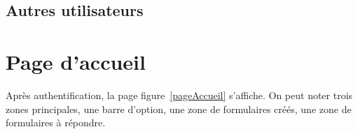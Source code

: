 \documentclass[a4paper,11pt,final]{report}
\begin{document}
\noindent\begin{minipage}{\linewidth}%
\label{authentificationCAS}
\end{minipage}
\subsection{Autres utilisateurs}

\section{Page d'accueil}
Après authentification, la page figure~\ref{pageAccueil} s'affiche. On peut noter trois zones principales, une barre d'option, une zone de formulaires créés, une zone de formulaires à répondre.\\
\noindent\begin{minipage}{\linewidth}%
\label{pageAccueil}
\end{minipage}
\end{document}
